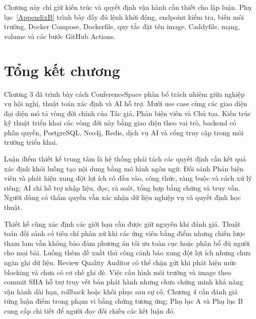 Chương này chỉ giữ kiến trúc và quyết định vận hành cần thiết cho lập luận. Phụ lục~\ref{AppendixB} trình bày đầy đủ lệnh khởi động, endpoint kiểm tra, biến môi trường, Docker Compose, Dockerfile, quy tắc đặt tên image, Caddyfile, mạng, volume và các bước GitHub Actions.

\section{Tổng kết chương}
\label{sec:ch3-demo-conclusion}

Chương 3 đã trình bày cách ConferenceSpace phân bổ trách nhiệm giữa nghiệp vụ hội nghị, thuật toán xác định và AI hỗ trợ. Mười use case cùng các giao diện đại diện mô tả vòng đời chính của Tác giả, Phản biện viên và Chủ tọa. Kiến trúc kỹ thuật triển khai các vòng đời này bằng giao diện theo vai trò, backend có phân quyền, PostgreSQL, Neo4j, Redis, dịch vụ AI và cổng truy cập trong môi trường triển khai.

Luận điểm thiết kế trung tâm là hệ thống phải tách các quyết định cần kết quả xác định khỏi luồng tạo nội dung bằng mô hình ngôn ngữ. Đối sánh Phản biện viên và phát hiện xung đột lợi ích có đầu vào, công thức, ràng buộc và cách xử lý riêng; AI chỉ hỗ trợ nhập liệu, đọc, rà soát, tổng hợp bằng chứng và truy vấn. Người dùng có thẩm quyền vẫn xác nhận dữ liệu nghiệp vụ và quyết định học thuật.

Thiết kế cũng xác định các giới hạn cần được giữ nguyên khi đánh giá. Thuật toán đối sánh có tiêu chí phân xử khi các ứng viên bằng điểm nhưng chiến lược tham lam vẫn không bảo đảm phương án tối ưu toàn cục hoặc phân bổ đủ người cho mọi bài. Luồng thêm đề xuất thủ công cảnh báo xung đột lợi ích nhưng chưa ngăn ghi dữ liệu. Review Quality Auditor có thể chặn gửi khi phát hiện mức blocking và chưa có cơ chế ghi đè. Việc cấu hình môi trường và image theo commit SHA hỗ trợ truy vết bản phát hành nhưng chưa chứng minh khả năng vận hành dài hạn, rollback hoặc khôi phục sau sự cố. Chương 4 cần đánh giá từng luận điểm trong phạm vi bằng chứng tương ứng; Phụ lục A và Phụ lục B cung cấp chi tiết để người đọc đối chiếu các kết luận đó.
